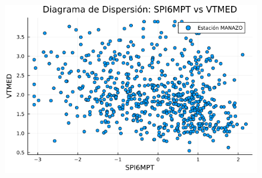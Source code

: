 \begin{figure}[htbp]
\begin{minipage}{0.32\textwidth}
    \includegraphics[width=\linewidth]{Capitulos/Scaterplot/MANAZO_SPI6MPT_vs_VTMED.png}
\end{minipage}

\vspace{0.5cm}  %


\end{figure}
